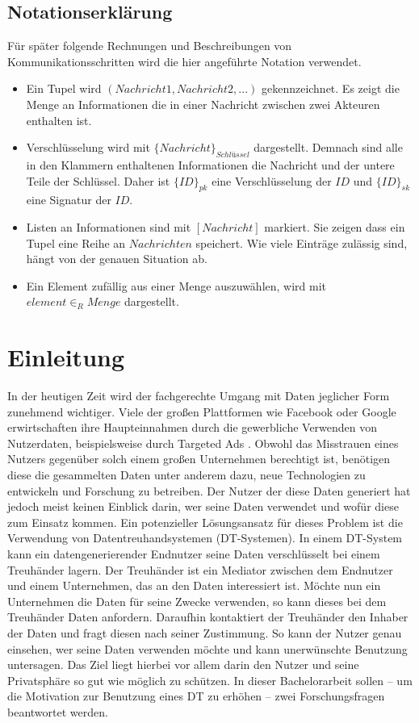 \documentclass[
	fontsize=11pt,
	headings=small,
	parskip=half,           %
	bibliography=totoc,
	numbers=noenddot,       %
	open=any,               %
]{scrreprt}
\begin{document}
\section*{Notationserklärung}
Für später folgende Rechnungen und Beschreibungen von Kommunikationsschritten wird die hier angeführte Notation verwendet.
\begin{itemize}
    \item Ein Tupel wird $(Nachricht 1, Nachricht 2,...)$ gekennzeichnet. Es zeigt die Menge an Informationen die in einer Nachricht zwischen zwei Akteuren enthalten ist.
    \item Verschlüsselung wird mit ${\{Nachricht\}}_{Schl\textit{ü}ssel}$ dargestellt. Demnach sind alle in den Klammern enthaltenen Informationen die Nachricht und der untere Teile der Schlüssel. Daher ist ${\{ID\}}_{pk}$ eine Verschlüsselung der $ID$ und ${\{ID\}}_{sk}$ eine Signatur der $ID$.
    \item Listen an Informationen sind mit $[Nachricht]$ markiert. Sie zeigen dass ein Tupel eine Reihe an $Nachrichten$ speichert. Wie viele Einträge zulässig sind, hängt von der genauen Situation ab.
    \item Ein Element zufällig aus einer Menge auszuwählen, wird mit $element {\in}_{R} Menge$ dargestellt.
\end{itemize}




\chapter{Einleitung}
\label{chap:intro}
In der heutigen Zeit wird der fachgerechte Umgang mit Daten jeglicher Form zunehmend wichtiger. Viele der großen Plattformen wie Facebook oder Google erwirtschaften ihre Haupteinnahmen durch die gewerbliche Verwenden von Nutzerdaten, beispielsweise durch Targeted Ads \cite{facebookad,googlead}. Obwohl das Misstrauen eines Nutzers gegenüber solch einem großen Unternehmen berechtigt ist, benötigen diese die gesammelten Daten unter anderem dazu, neue Technologien zu entwickeln und Forschung zu betreiben. Der Nutzer der diese Daten generiert hat jedoch meist keinen Einblick darin, wer seine Daten verwendet und wofür diese zum Einsatz kommen. Ein potenzieller Lösungsansatz für dieses Problem ist die Verwendung von Datentreuhandsystemen (DT-Systemen). In einem DT-System kann ein datengenerierender Endnutzer seine Daten verschlüsselt bei einem Treuhänder lagern. Der Treuhänder ist ein Mediator zwischen dem Endnutzer und einem Unternehmen, das an den Daten interessiert ist. Möchte nun ein Unternehmen die Daten für seine Zwecke verwenden, so kann dieses bei dem Treuhänder Daten anfordern. Daraufhin kontaktiert der Treuhänder den Inhaber der Daten und fragt diesen nach seiner Zustimmung. So kann der Nutzer genau einsehen, wer seine Daten verwenden möchte und kann unerwünschte Benutzung untersagen. Das Ziel liegt hierbei vor allem darin den Nutzer und seine Privatsphäre so gut wie möglich zu schützen. In dieser Bachelorarbeit sollen -- um die Motivation zur Benutzung eines DT zu erhöhen -- zwei Forschungsfragen beantwortet werden. 
\end{document}
